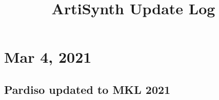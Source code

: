 \documentclass{article}
\title{ArtiSynth Update Log}
\date{}
\begin{document}
\iflatexml
\else
\maketitle
\fi

%
%
%







\section*{Mar 4, 2021}

\subsection*{Pardiso updated to MKL 2021}
\end{document}
